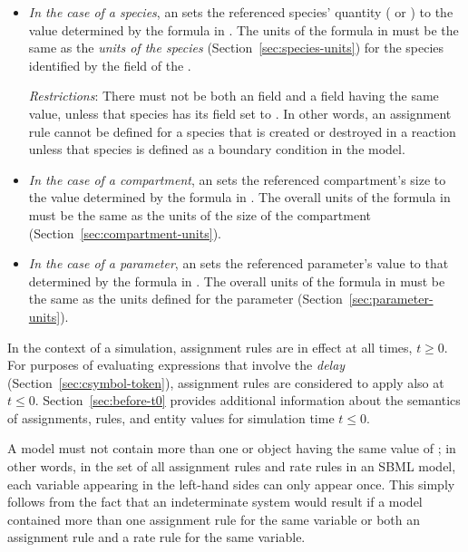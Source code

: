 \begin{itemize}
  
\item \emph{In the case of a species}, an \AssignmentRule sets the
  referenced species' quantity ( or
  ) to the value determined by the
  formula in .  The units of the formula in
   must be the same as the \emph{units of the species}
  (Section~\ref{sec:species-units}) for the species identified by
  the  field of the \AssignmentRule.
  
  \emph{Restrictions}: There must not be both an \AssignmentRule
   field and a \SpeciesReference {}
  field having the same value, unless that species has its
   field set to .  In other
  words, an assignment rule cannot be defined for a species that
  is created or destroyed in a reaction unless that species is
  defined as a boundary condition in the model.

\item \emph{In the case of a compartment}, an \AssignmentRule sets
  the referenced compartment's size to the value determined by the
  formula in .  The overall units of the formula in
   must be the same as the units of the size of the
  compartment (Section~\ref{sec:compartment-units}).
  
\item \emph{In the case of a parameter}, an \AssignmentRule sets
  the referenced parameter's value to that determined by the
  formula in .  The overall units of the formula in
   must be the same as the units defined for the
  parameter (Section~\ref{sec:parameter-units}).

\end{itemize}

In the context of a simulation, assignment rules are in effect at
all times, $t \geq 0$.  For purposes of evaluating expressions
that involve the \emph{delay} 
(Section~\ref{sec:csymbol-token}), assignment rules are considered
to apply also at $t \leq 0$.  Section~\ref{sec:before-t0} provides
additional information about the semantics of assignments, rules,
and entity values for simulation time $t \leq 0$.

A model must not contain more than one \AssignmentRule or
\RateRule object having the same value of ; in
other words, in the set of all assignment rules and rate rules in
an SBML model, each variable appearing in the left-hand sides can
only appear once.  This simply follows from the fact that an
indeterminate system would result if a model contained more than
one assignment rule for the same variable or both an assignment
rule and a rate rule for the same variable.

